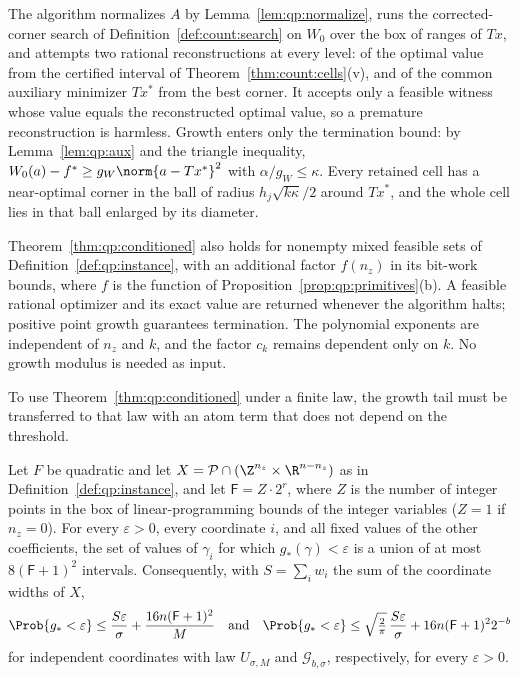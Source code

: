 The algorithm normalizes $A$ by Lemma~\ref{lem:qp:normalize}, runs the
corrected-corner search of Definition~\ref{def:count:search} on $W_0$ over the
box of ranges of $Tx$, and attempts two rational reconstructions at every
level: of the optimal value from the certified interval of
Theorem~\ref{thm:count:cells}(v), and of the common auxiliary minimizer $Tx^*$
from the best corner. It accepts only a feasible witness whose value equals
the reconstructed optimal value, so a premature reconstruction is harmless.
Growth enters only the termination bound: by Lemma~\ref{lem:qp:aux} and the
triangle inequality, $W_0(a)-f^*\ge g_W\norm{a-Tx^*}^2$ with
$\alpha/g_W\le\kappa$. Every retained cell has a near-optimal corner in the
ball of radius $h_j\sqrt{k\kappa}/2$ around $Tx^*$, and the whole cell lies
in that ball enlarged by its diameter.

\begin{corollary}\label{cor:qp:conditioned-mixed}
Theorem~\ref{thm:qp:conditioned} also holds for nonempty mixed feasible sets
of Definition~\ref{def:qp:instance}, with an additional factor $f(n_z)$
in its bit-work bounds, where $f$ is the function of
Proposition~\ref{prop:qp:primitives}(b). A feasible rational optimizer and
its exact value are returned whenever the algorithm halts; positive point
growth guarantees termination. The polynomial exponents are independent
of $n_z$ and $k$, and the factor $c_k$ remains dependent only on $k$.
No growth modulus is needed as input.
\end{corollary}

To use Theorem~\ref{thm:qp:conditioned} under a finite law, the growth tail
must be transferred to that law with an atom term that does not depend on the
threshold.

\begin{lemma}\label{lem:qp:growth-sections}
Let $F$ be quadratic and let $X=\mathcal P\cap(\Z^{n_z}\times\R^{n-n_z})$ as in
Definition~\ref{def:qp:instance}, and let $\mathsf F=Z\cdot2^r$, where $Z$ is
the number of integer points in the box of linear-programming bounds of the
integer variables ($Z=1$ if $n_z=0$). For every $\varepsilon>0$, every
coordinate $i$, and all fixed values of the other coefficients, the set of
values of $\gamma_i$ for which $g_*(\gamma)<\varepsilon$ is a union of at most
$8(\mathsf F+1)^2$ intervals. Consequently, with $S=\sum_iw_i$ the sum of the
coordinate widths of $X$,
\[
 \Prob\{g_*<\varepsilon\}\le\frac{S\varepsilon}\sigma+\frac{16n(\mathsf F+1)^2}M
 \quad\text{and}\quad
 \Prob\{g_*<\varepsilon\}\le\sqrt{\tfrac2\pi}\,\frac{S\varepsilon}\sigma+16n(\mathsf F+1)^22^{-b}
\]
for independent coordinates with law $U_{\sigma,M}$ and
$\mathcal G_{b,\sigma}$, respectively, for every $\varepsilon>0$.
\end{lemma}

